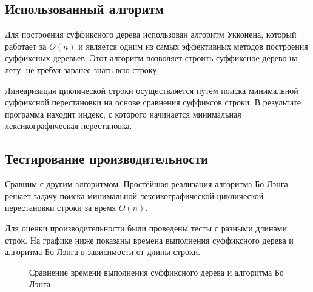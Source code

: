 \documentclass[12pt]{article}
\begin{document}
\subsection*{Использованный алгоритм}

Для построения суффиксного дерева использован алгоритм Укконена, который работает за $O(n)$ и является одним из самых эффективных методов построения суффиксных деревьев. Этот алгоритм позволяет строить суффиксное дерево на лету, не требуя заранее знать всю строку.

Линеаризация циклической строки осуществляется путём поиска минимальной суффиксной перестановки на основе сравнения суффиксов строки. В результате программа находит индекс, с которого начинается минимальная лексикографическая перестановка.


\subsection*{Тестирование производительности}
Сравним с другим алгоритмом. Простейшая реализация алгоритма Бо Лэнга решает задачу поиска минимальной лексикографической циклической перестановки строки за время $O(n)$.

Для оценки производительности были проведены тесты с разными длинами строк. На графике ниже показаны времена выполнения суффиксного дерева и алгоритма Бо Лэнга в зависимости от длины строки.

\begin{figure}[htbp]
    \centering
    \caption{Сравнение времени выполнения суффиксного дерева и алгоритма Бо Лэнга}
\end{figure}
\end{document}
